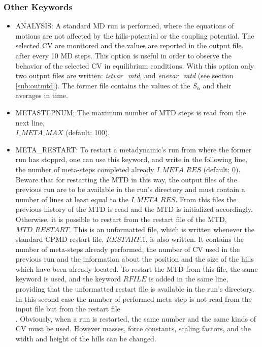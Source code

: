 \documentclass[twoside,10pt,titlepage,a4paper]{article}
\begin{document}
\subsubsection{Other Keywords}
\begin{itemize}
\item{ANALYSIS:} A standard MD run is performed, where the equations of motions are not
affected by the hills-potential or the coupling potential.
The selected CV are monitored and the values are reported in the
output file, after every 10 MD steps.
This option is useful in order to observe the behavior of the selected CV in equilibrium conditions.
With this option only two output files are written: {\it istvar\_mtd}, and {\it enevar\_mtd} (see section 
\ref{sub:outmtd}). The former file contains the values of the $S_{\alpha}$ and their averages in time.

\item{METASTEPNUM:} The maximum number of MTD steps is read from the
next line,\\$I\_META\_MAX$ (default: 100).

\item{META\_RESTART:}
To restart a metadynamic's run from where the former run has stopprd, one can use this keyword, and write in the 
following line, the number of meta-steps completed already $I\_META\_RES$ (default: 0).
 Beware that for restarting the MTD in this way, the output
files of the previous run are to be available in the run's directory and must contain a number
of lines at least equal to the $I\_META\_RES$.
From this files the previous history of the MTD is read and the MTD is initialized accordingly. \\
Otherwise, it is possible to restart from the restart file of the MTD, $MTD\_RESTART$.
 This is an unformatted file, which is written whenever the standard CPMD restart file, $RESTART.1$, is also written.
It contains the number of meta-steps already performed, the number of CV used in the previous run and the information 
about the position and the size of the hills which have been already located.
To restart the MTD from this file,  the same keyword is used, and the keyword $RFILE$ is added in the same line, 
providing that the unformatted restart file is available in the run's directory.
In this second case the number of performed meta-step is not read from the input file but from the restart file \\.
Obviously, when a run is restarted, the same number and the same kinds of CV must be used. However masses, force 
constants, scaling factors, and the width and height of the hills can be changed.


\end{itemize}
\end{document}
